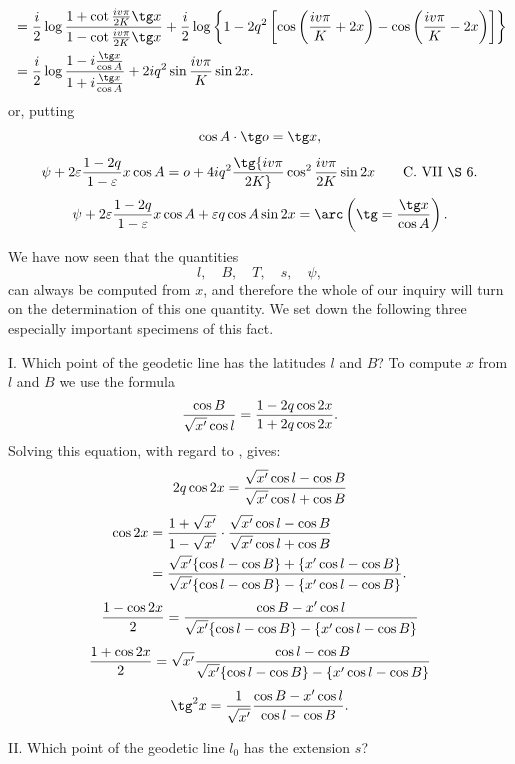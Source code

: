 \begingroup\small
\[
\begin{aligned}
&={i\over2}\log{1+\cot{iv\pi\over2K}\tg x\over1-\cot{iv\pi\over2K}\tg x}
+{i\over2}\log\left\{1-2q^2\left[\cos\left({iv\pi\over K}+2x\right)-\cos\left({iv\pi\over K}-2x\right)\right]\right\}\\
&={i\over2}\log{1-i{\tg x\over\cos A}\over1+i{\tg x\over\cos A}}
+2iq^2\sin{iv\pi\over K}\sin2x.
\end{aligned}
\]
or, putting
\[
 \cos A\cdot\tg o=\tg x,
\]
\[
 \psi+2\varepsilon{1-2q\over1-\varepsilon}x\cos A
 =o+4iq^2\tg{iv\pi\over2K}\cos^2{iv\pi\over2K}\sin2x
 \qquad\text{C. VII \S\ 6.}
\]
\[
 \psi+2\varepsilon{1-2q\over1-\varepsilon}x\cos A+\varepsilon q\cos A\sin2x
 =\arc\left(\tg={\tg x\over\cos A}\right).
\]


We have now seen that the quantities
\[
 l,\quad B,\quad T,\quad s,\quad \psi,
\]
can always be computed from $x$, and therefore the whole of our inquiry will turn on the determination of this one quantity. We set down the following three especially important specimens of this fact.

I. Which point of the geodetic line has the latitudes $l$ and $B$? To compute $x$ from $l$ and $B$ we use the formula
\[
 {\cos B\over\sqrt{x'}\cos l}={1-2q\cos2x\over1+2q\cos2x}.
\]
Solving this equation, with regard to , gives:
\[
 2q\cos2x={\sqrt{x'}\cos l-\cos B\over\sqrt{x'}\cos l+\cos B}
\]
\[
\begin{aligned}
\cos2x&={1+\sqrt{x'}\over1-\sqrt{x'}}\cdot{\sqrt{x'}\cos l-\cos B\over\sqrt{x'}\cos l+\cos B}\\
&={\sqrt{x'}\{\cos l-\cos B\}+\{x'\cos l-\cos B\}
\over
\sqrt{x'}\{\cos l-\cos B\}-\{x'\cos l-\cos B\}}.
\end{aligned}
\]
\[
 {1-\cos2x\over2}={\cos B-x'\cos l\over \sqrt{x'}\{\cos l-\cos B\}-\{x'\cos l-\cos B\}}
\]
\[
 {1+\cos2x\over2}=\sqrt{x'}{\cos l-\cos B\over \sqrt{x'}\{\cos l-\cos B\}-\{x'\cos l-\cos B\}}
\]
\[
 \tg^2x={1\over\sqrt{x'}}{\cos B-x'\cos l\over\cos l-\cos B}.
\]

II. Which point of the geodetic line $l_0$ has the extension $s$?
\endgroup
